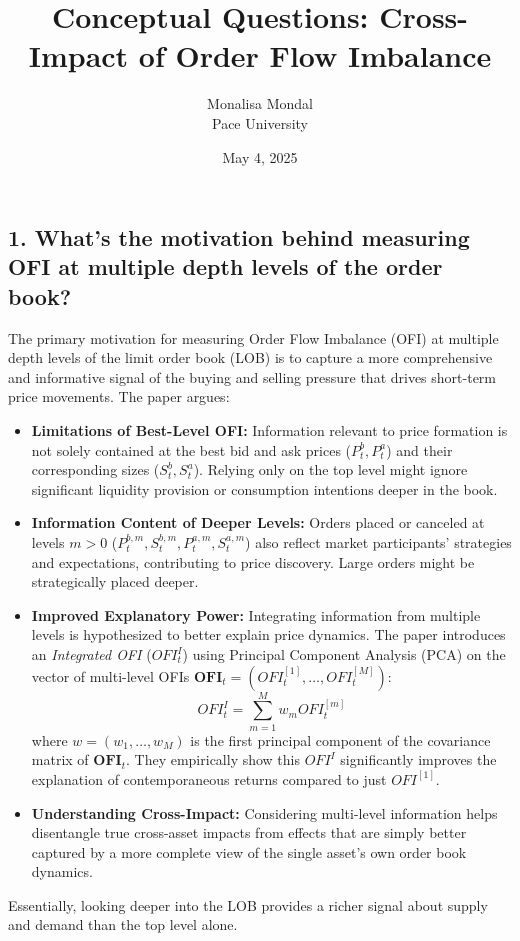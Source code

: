 \documentclass{article}
\title{Conceptual Questions: Cross-Impact of Order Flow Imbalance}
\author{Monalisa Mondal \\
Pace University} %
\date{May 4, 2025} %
\begin{document}
\maketitle

 

\subsection*{1. What’s the motivation behind measuring OFI at multiple depth levels of the order book?}

The primary motivation for measuring Order Flow Imbalance (OFI) at multiple depth levels of the limit order book (LOB) is to capture a more comprehensive and informative signal of the buying and selling pressure that drives short-term price movements. The paper argues:

\begin{itemize}
    \item \textbf{Limitations of Best-Level OFI:} Information relevant to price formation is not solely contained at the best bid and ask prices ($P^b_t, P^a_t$) and their corresponding sizes ($S^b_t, S^a_t$). Relying only on the top level might ignore significant liquidity provision or consumption intentions deeper in the book.
    \item \textbf{Information Content of Deeper Levels:} Orders placed or canceled at levels $m > 0$ ($P^{b,m}_t, S^{b,m}_t, P^{a,m}_t, S^{a,m}_t$) also reflect market participants' strategies and expectations, contributing to price discovery. Large orders might be strategically placed deeper.
    \item \textbf{Improved Explanatory Power:} Integrating information from multiple levels is hypothesized to better explain price dynamics. The paper introduces an \textit{Integrated OFI} ($OFI^I_t$) using Principal Component Analysis (PCA) on the vector of multi-level OFIs $\mathbf{OFI}_t = (OFI^{[1]}_t, \dots, OFI^{[M]}_t)$:
    \begin{equation} \label{eq:ofi_integrated}
        OFI^I_t = \sum_{m=1}^{M} w_m OFI^{[m]}_t
    \end{equation}
    where $w = (w_1, \dots, w_M)$ is the first principal component of the covariance matrix of $\mathbf{OFI}_t$. They empirically show this $OFI^I$ significantly improves the explanation of contemporaneous returns compared to just $OFI^{[1]}$.
    \item \textbf{Understanding Cross-Impact:} Considering multi-level information helps disentangle true cross-asset impacts from effects that are simply better captured by a more complete view of the single asset's own order book dynamics.
\end{itemize}
Essentially, looking deeper into the LOB provides a richer signal about supply and demand than the top level alone.
\end{document}

